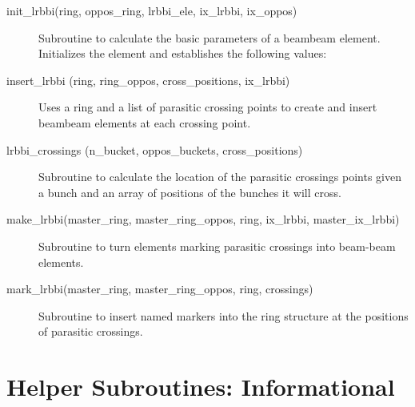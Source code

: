 \begin{description}

\item[init\_lrbbi(ring, oppos\_ring, lrbbi\_ele, ix\_lrbbi, ix\_oppos)] \Newline 
     Subroutine to calculate the basic parameters of a beambeam element. 
     Initializes the element and establishes the following values:

\item[insert\_lrbbi (ring, ring\_oppos, cross\_positions, ix\_lrbbi)] \Newline
Uses a ring and a list of parasitic crossing points to create and insert 
beambeam elements at each crossing point. 

\item[lrbbi\_crossings (n\_bucket, oppos\_buckets, cross\_positions)] \Newline
Subroutine to calculate the location of the parasitic crossings points 
given a bunch and an array of positions of the bunches it will cross. 

\item[make\_lrbbi(master\_ring, master\_ring\_oppos, ring, ix\_lrbbi, master\_ix\_lrbbi)] \Newline
Subroutine to turn elements marking parasitic crossings into beam-beam elements. 

\item[mark\_lrbbi(master\_ring, master\_ring\_oppos, ring, crossings)] \Newline
Subroutine to insert named markers into the ring structure at the positions of parasitic crossings. 

\end{description}

\section{Helper Subroutines: Informational}
\label{r:info}     

